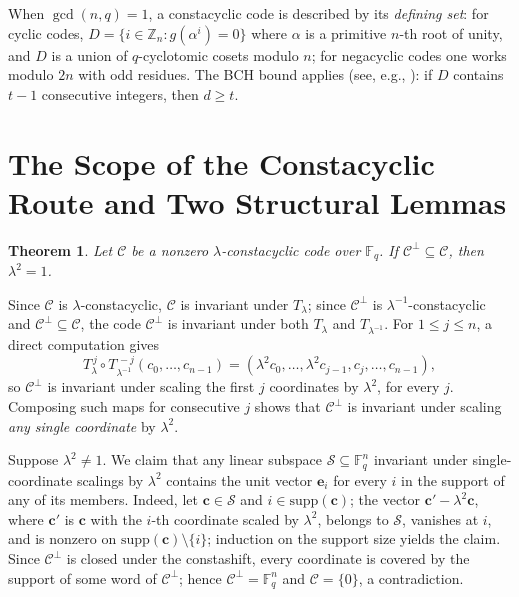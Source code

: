 \documentclass[journal,onecolumn]{IEEEtran}
\newtheorem{thm}{Theorem}
\newcommand{\Ff}{{\mathbb F}}
\newcommand{\cc}{{\mathcal C}}
\begin{document}
When $\gcd(n,q)=1$, a constacyclic code is described by its \emph{defining set}: for cyclic codes, $D=\{i\in\mathbb Z_n: g(\alpha^i)=0\}$ where $\alpha$ is a primitive $n$-th root of unity, and $D$ is a union of $q$-cyclotomic cosets modulo $n$; for negacyclic codes one works modulo $2n$ with odd residues. The BCH bound applies (see, e.g., \cite[Ch.~5]{Huffman2003}): if $D$ contains $t-1$ consecutive integers, then $d\ge t$.

\section{The Scope of the Constacyclic Route and Two Structural Lemmas}\label{sec:lemmas}

\begin{thm}\label{thm:lambda}
Let $\cc$ be a nonzero $\lambda$-constacyclic code over $\Ff_q$. If $\cc^{\perp}\subseteq \cc$, then $\lambda^2=1$.
\end{thm}

\begin{IEEEproof}
Since $\cc$ is $\lambda$-constacyclic, $\cc$ is invariant under $T_\lambda$; since $\cc^\perp$ is $\lambda^{-1}$-constacyclic and $\cc^\perp\subseteq\cc$, the code $\cc^\perp$ is invariant under both $T_\lambda$ and $T_{\lambda^{-1}}$. For $1\le j\le n$, a direct computation gives
\[
T_\lambda^{\,j}\circ T_{\lambda^{-1}}^{\,-j}(c_0,\dots,c_{n-1})=(\lambda^2 c_0,\dots,\lambda^2 c_{j-1},c_j,\dots,c_{n-1}),
\]
so $\cc^\perp$ is invariant under scaling the first $j$ coordinates by $\lambda^2$, for every $j$. Composing such maps for consecutive $j$ shows that $\cc^\perp$ is invariant under scaling \emph{any single coordinate} by $\lambda^2$.

Suppose $\lambda^2\neq 1$. We claim that any linear subspace $\mathcal S\subseteq\Ff_q^n$ invariant under single-coordinate scalings by $\lambda^2$ contains the unit vector $\mathbf e_i$ for every $i$ in the support of any of its members. Indeed, let $\mathbf c\in\mathcal S$ and $i\in\mathrm{supp}(\mathbf c)$; the vector $\mathbf c'-\lambda^2\mathbf c$, where $\mathbf c'$ is $\mathbf c$ with the $i$-th coordinate scaled by $\lambda^2$, belongs to $\mathcal S$, vanishes at $i$, and is nonzero on $\mathrm{supp}(\mathbf c)\setminus\{i\}$; induction on the support size yields the claim. Since $\cc^\perp$ is closed under the constashift, every coordinate is covered by the support of some word of $\cc^\perp$; hence $\cc^\perp=\Ff_q^n$ and $\cc=\{0\}$, a contradiction.
\end{IEEEproof}
\end{document}
